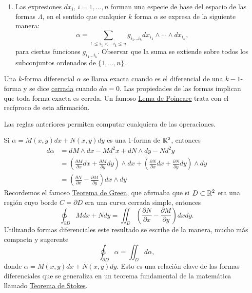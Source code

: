 \begin{subappendices}
\begin{enumerate}
\begin{enumerate}
  \end{enumerate}
  \item Las expresiones $dx_i$, $i=1,\ldots,n$ forman una especie de base del espacio de las formas $\Lambda$, en el sentido que cualquier $k$ forma $\alpha$ se expresa de la siguiente manera:
  \[\alpha=\sum_{1\leq i_1<\cdots i_k\leq n}g_{i_1\ldots i_k} dx_{i_1}\wedge\cdots\wedge dx_{i_n},\]
  para ciertas funciones $g_{i_1\ldots i_k}$. Observar que la suma se extiende sobre todos los subconjuntos ordenados de $\{1,\ldots,n\}$.
\end{enumerate}


Una $k$-forma diferencial $\alpha$ se llama \href{https://es.wikipedia.org/wiki/Formas_diferenciales_cerradas_y_exactas}{exacta} cuando es el diferencial de una $k-1$-forma y se dice \href{https://es.wikipedia.org/wiki/Formas_diferenciales_cerradas_y_exactas}{cerrada} cuando $d\alpha=0$. Las propiedades de las formas implican que toda forma exacta es cerrda. Un famoso \href{https://es.wikipedia.org/wiki/Formas_diferenciales_cerradas_y_exactas#Lema_de_Poincar.C3.A9}{Lema de Poincare} trata con el recíproco de esta afirmación.

Las reglas anteriores permiten computar cualquiera de las operaciones.
\begin{ejemplo} Si $\alpha=M(x,y)dx+N(x,y)dy$ es una 1-forma de $\mathbb{R}^2$, entonces
\[ \begin{split}
    d\alpha&=dM\wedge dx-Md^2x + dN\wedge dy-Nd^2y\\
    &=\left(\frac{\partial M}{\partial x}dx+ \frac{\partial M}{\partial y}dy\right)\wedge dx+
    \left(\frac{\partial N}{\partial x}dx+ \frac{\partial N}{\partial y}dy\right)\wedge dy\\
    &= \left(\frac{\partial N}{\partial x}- \frac{\partial M}{\partial y}\right) dx\wedge dy
   \end{split}
\]
Recordemos el famoso \href{https://es.wikipedia.org/wiki/Teorema_de_Green}{Teorema de Green}, que afirmaba que si $D\subset \mathbb{R}^2$ era una región cuyo borde $C=\partial D$ era una curva cerrada simple, entonces
\[\ointctrclockwise_{\partial D} Mdx +Ndy=\iint_D \left(\frac{\partial N}{\partial x}- \frac{\partial M}{\partial y}\right) dx dy.\]
Utilizando formas diferenciales este resultado se escribe de la manera, mucho más compacta y sugerente
\[\ointctrclockwise_{\partial D} \alpha = \iint_Dd\alpha,\]
donde $\alpha =M(x,y)dx+N(x,y)dy$.  Esto es una relación clave de las formas diferenciales que se generaliza en un teorema fundamental de la matemática llamado \href{https://es.wikipedia.org/wiki/Teorema_de_Stokes}{Teorema de Stokes}.
\end{ejemplo}





\end{subappendices}
